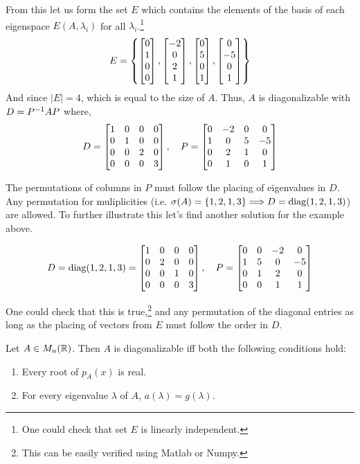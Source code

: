 \begin{itemize}
    From this let us form the set $E$ which contains the elements of the basis of each eigenspace $E(A, \lambda_i)$ for all $\lambda_i$.\footnote{One could check that set $E$ is linearly independent.}
    $$E = \left\{\begin{bmatrix} 0 \\ 1 \\ 0 \\ 0 \end{bmatrix}, \begin{bmatrix} -2 \\ 0 \\ 2 \\ 1 \end{bmatrix}, \begin{bmatrix} 0 \\ 5 \\ 0 \\ 1 \end{bmatrix}, \begin{bmatrix} 0 \\ -5 \\ 0 \\ 1 \end{bmatrix}\right\}$$
    And since $|E| = 4$, which is equal to the size of $A$. Thus, $A$ is diagonalizable with $D = P^{-1} AP$ where,
    $$D = \begin{bmatrix} 1 & 0 & 0 & 0 \\ 0 & 1 & 0 & 0 \\ 0 & 0 & 2 & 0 \\ 0 & 0 & 0 & 3 \end{bmatrix}, \quad P = \begin{bmatrix} 0 & -2 & 0 & 0 \\ 1 & 0 & 5 & -5 \\ 0 & 2 & 1 & 0 \\ 0 & 1 & 0 & 1 \end{bmatrix}$$
    
\end{itemize}
\newpage
The permutations of columns in $P$ must follow the placing of eigenvalues in $D$. Any permutation for muliplicities (i.e. $\sigma(A) = \{1, 2, 1, 3\} \Longrightarrow D = \operatorname{diag}(1, 2, 1, 3)$) are allowed. To further illustrate this let's find another solution for the example above.

$$D = \operatorname{diag}(1, 2, 1, 3) = \begin{bmatrix} 1 & 0 & 0 & 0 \\ 0 & 2 & 0 & 0 \\ 0 & 0 & 1 & 0 \\ 0 & 0 & 0 & 3 \end{bmatrix}, \quad P = \begin{bmatrix} 0 & 0 & -2 & 0 \\ 1 & 5 & 0 & -5 \\ 0 & 1 & 2 & 0 \\ 0 & 0 & 1 & 1 \end{bmatrix}$$

One could check that this is true,\footnote{This can be easily verified using Matlab or Numpy.} and any permutation of the diagonal entries as long as the placing of vectors from $E$ must follow the order in $D$.



\begin{theorem}
Let $A \in M_n(\mathbb{R})$. Then $A$ is diagonalizable iff both the following conditions hold:
\begin{enumerate}
    \item Every root of $p_A(x)$ is real.
    \item For every eigenvalue $\lambda$ of $A$, $a(\lambda) = g(\lambda)$.
\end{enumerate}
\end{theorem}

